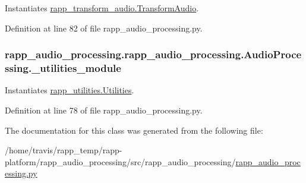 Instantiates \hyperlink{classrapp__audio__processing_1_1rapp__transform__audio_1_1TransformAudio}{rapp\-\_\-transform\-\_\-audio.\-Transform\-Audio}. 



Definition at line 82 of file rapp\-\_\-audio\-\_\-processing.\-py.

\hypertarget{classrapp__audio__processing_1_1rapp__audio__processing_1_1AudioProcessing_afedf690b9ec2f330bcda9b50ebc92714}{
\subsubsection[{\-\_\-utilities\-\_\-module}]{\setlength{\rightskip}{0pt plus 5cm}rapp\-\_\-audio\-\_\-processing.\-rapp\-\_\-audio\-\_\-processing.\-Audio\-Processing.\-\_\-utilities\-\_\-module\hspace{0.3cm}{\ttfamily [private]}}}\label{classrapp__audio__processing_1_1rapp__audio__processing_1_1AudioProcessing_afedf690b9ec2f330bcda9b50ebc92714}


Instantiates \hyperlink{classrapp__audio__processing_1_1rapp__utilities_1_1Utilities}{rapp\-\_\-utilities.\-Utilities}. 



Definition at line 78 of file rapp\-\_\-audio\-\_\-processing.\-py.



The documentation for this class was generated from the following file\-:\begin{DoxyCompactItemize}
\item 
/home/travis/rapp\-\_\-temp/rapp-\/platform/rapp\-\_\-audio\-\_\-processing/src/rapp\-\_\-audio\-\_\-processing/\hyperlink{rapp__audio__processing_8py}{rapp\-\_\-audio\-\_\-processing.\-py}\end{DoxyCompactItemize}
